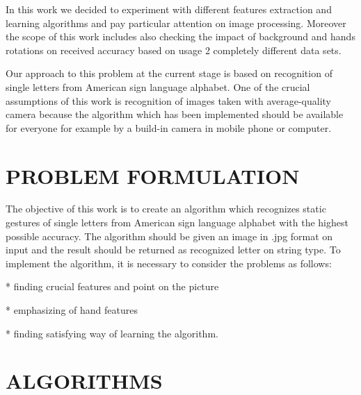\documentclass[11pt,a4paper]{article}
\begin{document}
	In this work we decided to experiment with different features extraction and learning algorithms and pay particular attention on image processing. Moreover the scope of this work includes also checking the impact of background and hands rotations on received accuracy based on usage 2 completely different data sets.
	
	Our approach to this problem at the current stage is based on recognition of single letters from American sign language alphabet. One of the crucial assumptions of this work is recognition of images taken with average-quality camera because the algorithm which has been implemented should be available for everyone for example by a build-in camera in mobile phone or computer.
	
	
	
	
	

	

\section{PROBLEM FORMULATION}

	The objective of this work is to create an algorithm which recognizes static gestures of single letters from American sign language alphabet with the highest possible accuracy. The algorithm should be given an image in .jpg format on input and the result should be returned as recognized letter on string type. To implement the algorithm, it is necessary to consider the problems as follows:
	
* finding crucial features and point on the picture

* emphasizing of hand features
	
* finding satisfying way of learning the algorithm.









\section{ALGORITHMS}
\end{document}
